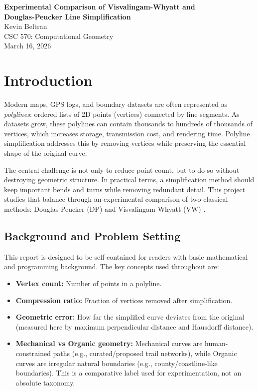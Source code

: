 \documentclass[12pt]{article}
\begin{document}
\begin{center}
    \vspace*{1em}
    \textbf{\Large Experimental Comparison of Visvalingam-Whyatt and \\ Douglas-Peucker Line Simplification} \\
    \vspace{1em}
    Kevin Beltran \\
    CSC 570: Computational Geometry \\
    March 16, 2026
\end{center}

\section{Introduction}
Modern maps, GPS logs, and boundary datasets are often represented as \emph{polylines}: ordered lists of 2D points (vertices) connected by line segments. As datasets grow, these polylines can contain thousands to hundreds of thousands of vertices, which increases storage, transmission cost, and rendering time. Polyline simplification addresses this by removing vertices while preserving the essential shape of the original curve.

The central challenge is not only to reduce point count, but to do so without destroying geometric structure. In practical terms, a simplification method should keep important bends and turns while removing redundant detail. This project studies that balance through an experimental comparison of two classical methods: Douglas-Peucker (DP) \cite{dp1973} and Visvalingam-Whyatt (VW) \cite{vw1992}.

\subsection{Background and Problem Setting}
This report is designed to be self-contained for readers with basic mathematical and programming background. The key concepts used throughout are:
\begin{itemize}
    \item \textbf{Vertex count:} Number of points in a polyline.
    \item \textbf{Compression ratio:} Fraction of vertices removed after simplification.
    \item \textbf{Geometric error:} How far the simplified curve deviates from the original (measured here by maximum perpendicular distance and Hausdorff distance).
    \item \textbf{Mechanical vs Organic geometry:}  
    Mechanical curves are human-constrained paths (e.g., curated/proposed trail networks), while Organic curves are irregular natural boundaries (e.g., county/coastline-like boundaries). This is a comparative label used for experimentation, not an absolute taxonomy.
\end{itemize}
\end{document}
